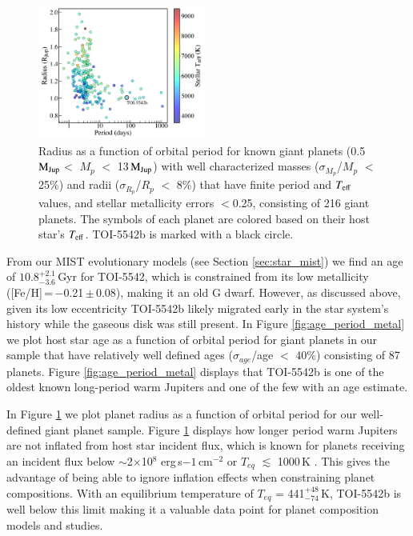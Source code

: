 \documentclass{aa}
\newcommand{\feh}{\mbox{[Fe/H]}\xspace}
\newcommand{\teff}{\ensuremath{T_{\rm eff}}\xspace}
\newcommand{\mjup}{\mbox{$\mathrm{M_{\rm Jup}}$}\xspace}
\begin{document}
\begin{figure}
  \centering
  \includegraphics[width=0.49\textwidth]{figures/radius_period_teff_all.pdf}
 \caption{Radius as a function of orbital period for known giant planets (0.5\,\mjup $<$ $M_p$ $<$ 13\,\mjup) with well characterized masses ($\sigma_{M_p}$/$M_p$ $<$ 25\%) and radii ($\sigma_{R_p}$/$R_p$ $<$ 8\%) that have finite period and \teff values, and stellar metallicity errors $<$0.25, consisting of 216 giant planets. The symbols of each planet are colored based on their host star's \teff. TOI-5542b is marked with a black circle.}
  \label{fig:rad_period_teff}
\end{figure}

From our MIST evolutionary models (see Section \ref{sec:star_mist}) we find an age of $10.8^{+2.1}_{-3.6}$\,Gyr for TOI-5542, which is constrained from its low metallicity (\feh\,=\,$-$0.21\,$\pm$\,0.08), making it an old G dwarf. However, as discussed above, given its low eccentricity TOI-5542b likely migrated early in the star system's history while the gaseous disk was still present. In Figure \ref{fig:age_period_metal} we plot host star age as a function of orbital period for giant planets in our sample that have relatively well defined ages ($\sigma_{age}$/age $<$ 40\%) consisting of 87 planets. Figure \ref{fig:age_period_metal} displays that TOI-5542b is one of the oldest known long-period warm Jupiters and one of the few with an age estimate.

In Figure \ref{fig:rad_period_teff} we plot planet radius as a function of orbital period for our well-defined giant planet sample. Figure \ref{fig:rad_period_teff} displays how longer period warm Jupiters are not inflated from host star incident flux, which is known for planets receiving an incident flux below $\sim$2$\times$10$^{8}$ erg\,s${-1}$\,cm$^{-2}$ or $T_{eq}$ $\lesssim$ 1000\,K \citep{Demory2011,Miller2011}. This gives the advantage of being able to ignore inflation effects when constraining planet compositions. With an equilibrium temperature of $T_{eq}$ = 441$^{+48}_{-74}$\,K, TOI-5542b is well below this limit making it a valuable data point for planet composition models and studies. 
\end{document}
